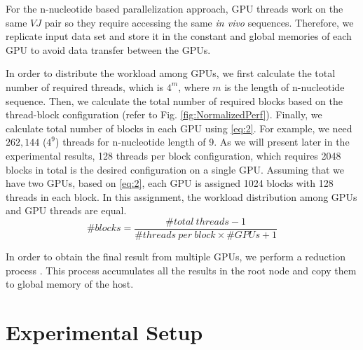 For the n-nucleotide based parallelization approach, GPU threads work on the same $VJ$ pair so they require accessing the same \emph{in vivo} sequences. Therefore, we replicate input data set and store it in the constant and global memories of each GPU to avoid data transfer between the GPUs.

In order to distribute the workload among GPUs, we first calculate the total number of required threads, which is $4^m$, where $m$ is the length of n-nucleotide sequence. Then, we calculate the total number of required blocks based on the thread-block configuration (refer to Fig. \ref{fig:NormalizedPerf}). Finally, we calculate total number of blocks in each GPU using \ref{eq:2}. For example, we need $262,144$ ($4^9 $) threads for n-nucleotide length of 9. As we will present later in the experimental results, 128 threads per block configuration, which requires 2048 blocks in total  is the desired configuration on a single GPU.  Assuming that we have two GPUs, based on \ref{eq:2}, each GPU is assigned 1024 blocks with 128 threads in each block. In this assignment, the workload distribution among GPUs and GPU threads are equal. 
\begin{equation}\label{eq:2}
\# blocks = \frac{\# total~threads-1}{\# threads~per~block \times \# GPUs+1}
\end{equation}


In order to obtain the final result from multiple GPUs, we perform a reduction process \cite{b23}. This process accumulates all the results in the root node and copy them to global memory of the host. 

\section{Experimental Setup}
\label{sec:ExptSetup}

